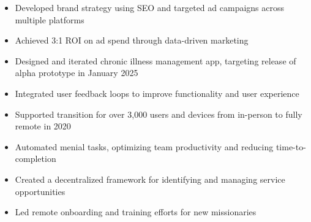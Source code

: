 \par\smallskip
\noindent
\begin{minipage}{20cm}
  \begin{minipage}{9.75cm}
    \begin{itemize}
      \item Developed brand strategy using SEO and targeted ad campaigns across multiple platforms
      \item Achieved 3:1 ROI on ad spend through data-driven marketing
    \end{itemize}
  \end{minipage}
  \hfill
  \begin{minipage}{9.75cm}
    \begin{itemize}
      \item Designed and iterated chronic illness management app, targeting release of alpha prototype in January 2025
      \item Integrated user feedback loops to improve functionality and user experience
    \end{itemize}
  \end{minipage}
\end{minipage}
\par\smallskip
\divider

\par\smallskip
\noindent
\begin{minipage}{20cm}
  \begin{minipage}{9.75cm}
    \begin{itemize}
      \item Supported transition for over 3,000 users and devices from in-person to fully remote in 2020
      \item Automated menial tasks, optimizing team productivity and reducing time-to-completion
    \end{itemize}
  \end{minipage}
  \hfill
  \begin{minipage}{9.75cm}
    \begin{itemize}
      \item Created a decentralized framework for identifying and managing service opportunities
      \item Led remote onboarding and training efforts for new missionaries
    \end{itemize}
  \end{minipage}
\end{minipage}

